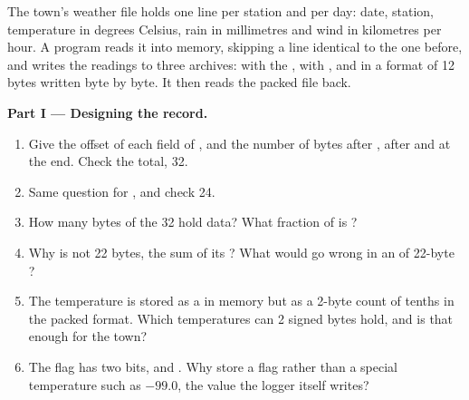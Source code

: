 \begin{problem}\label{pb:b1:c-strings-structs-files:1}
The town's weather file holds one line per station and per day: date, station, temperature in degrees Celsius, rain in
millimetres and wind in kilometres per hour. A program reads it into memory, skipping a line identical to the one
before, and writes the readings to three archives:  with the  ,
 with , and  in a format of 12 bytes written byte by byte. It then
reads the packed file back.
\label{lst:b1:c-strings-structs-files:weather-h}
\label{lst:b1:c-strings-structs-files:weather-io}
\label{lst:b1:c-strings-structs-files:pack}
\label{out:b1:c-strings-structs-files:problem}

\medskip\noindent\textbf{Part I --- Designing the record.}
\begin{enumerate}
\item Give the offset of each field of , and the number of  bytes after ,
after  and at the end. Check the total, 32.
\item Same question for , and check 24.
\item How many bytes of the 32 hold data? What fraction of  is ?
\item Why is  not 22 bytes, the sum of its ? What would go wrong in an  of 22-byte ?
\item The temperature is stored as a  in memory but as a 2-byte count of tenths in the packed format. Which
temperatures can 2 signed bytes hold, and is that enough for the town?
\item The flag has two bits,  and . Why store a flag rather than a special
temperature such as $-99.0$, the value the logger itself writes?
\end{enumerate}


\end{problem}
